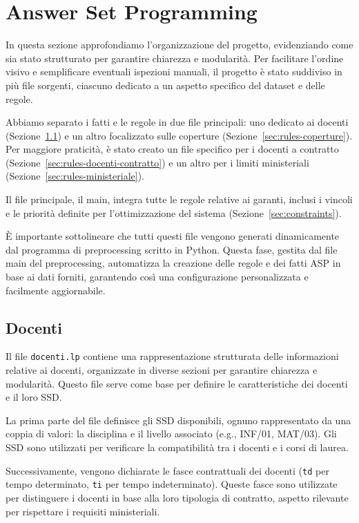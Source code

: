\section{Answer Set Programming}\label{sec:asp}

In questa sezione approfondiamo l'organizzazione del progetto, evidenziando 
come sia stato strutturato per garantire chiarezza e modularità. 
Per facilitare l'ordine visivo e semplificare eventuali ispezioni manuali, 
il progetto è stato suddiviso in più file sorgenti, ciascuno dedicato a un 
aspetto specifico del dataset e delle regole.

Abbiamo separato i fatti e le regole in due file principali: uno dedicato 
ai docenti (Sezione~\ref*{sec:rules-docenti}) e un altro focalizzato sulle 
coperture (Sezione~\ref*{sec:rules-coperture}). Per maggiore praticità, è 
stato creato un file specifico per i docenti a contratto 
(Sezione~\ref*{sec:rules-docenti-contratto}) e un altro per i limiti 
ministeriali (Sezione~\ref*{sec:rules-ministeriale}).

Il file principale, il main, integra tutte le regole relative ai garanti, 
inclusi i vincoli e le priorità definite per l'ottimizzazione del sistema 
(Sezione~\ref*{sec:constraints}).

È importante sottolineare che tutti questi file vengono generati dinamicamente 
dal programma di preprocessing scritto in Python. Questa fase, gestita dal 
file main del preprocessing, automatizza la creazione delle regole e dei 
fatti ASP in base ai dati forniti, garantendo così una configurazione 
personalizzata e facilmente aggiornabile. 


\subsection{Docenti}\label{sec:rules-docenti}
Il file \texttt{docenti.lp} contiene una rappresentazione strutturata delle 
informazioni relative ai docenti, organizzate in diverse sezioni per garantire 
chiarezza e modularità. Questo file serve come base per definire le caratteristiche 
dei docenti e il loro SSD.

La prima parte del file definisce gli SSD disponibili, ognuno rappresentato da una 
coppia di valori: la disciplina e il livello associato (e.g., INF/01, MAT/03). Gli SSD 
sono utilizzati per verificare la compatibilità tra i docenti e i corsi di laurea.

Successivamente, vengono dichiarate le fasce contrattuali dei docenti (\texttt{td} 
per tempo determinato, \texttt{ti} per tempo indeterminato). Queste fasce sono 
utilizzate per distinguere i docenti in base alla loro tipologia di contratto, 
aspetto rilevante per rispettare i requisiti ministeriali.

